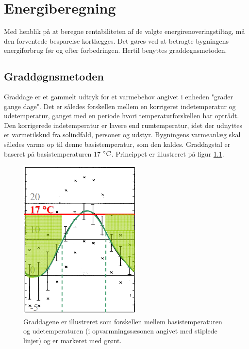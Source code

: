 \chapter{Energiberegning} \label{sec:energi}

Med henblik på at beregne rentabiliteten af de valgte energirenoveringstiltag, må den forventede besparelse kortlægges. Det gøres ved at betragte bygningens energiforbrug før og efter forbedringen. Hertil benyttes graddøgnsmetoden.

\section{Graddøgnsmetoden}

Graddage er et gammelt udtryk for et varmebehov angivet i enheden "grader gange dage". Det er således forskellen mellem en korrigeret indetemperatur og udetemperatur, ganget med en periode hvori temperaturforskellen har optrådt. Den korrigerede indetemperatur er lavere end rumtemperatur, idet der udnyttes et varmetilskud fra solindfald, personer og udstyr. Bygningens varmeanlæg skal således varme op til denne basistemperatur, som den kaldes. Graddagstal er baseret på basistemperaturen 17 $^{\circ}\text{C}$. Princippet er illustreret på figur \ref{fig:gdmetode}.

\begin{figure}[H]
	\centering
	\includegraphics[width=0.55\textwidth]{billeder/graddage.png}
	\caption{Graddagene er illustreret som forskellen mellem basistemperaturen og udetemperaturen (i opvarmningssæsonen angivet med stiplede linjer) og er markeret med grønt.}
	\label{fig:gdmetode}
\end{figure}

